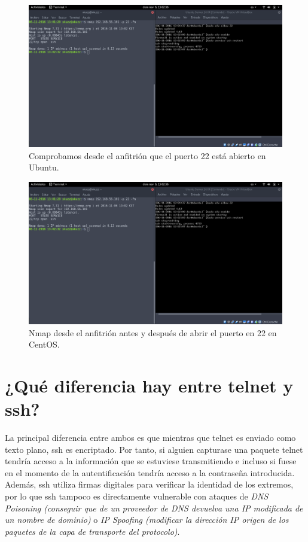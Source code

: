 \begin{flushleft}
\begin{figure}[H]
	\centering
	\includegraphics[scale=0.3]{nmap_ubu.png}
	\caption{Comprobamos desde el anfitrión que el puerto 22 está abierto en Ubuntu.}
\end{figure}

\begin{figure}[H]
	\centering
	\includegraphics[scale=0.3]{nmap_ubu.png}
	\caption{Nmap desde el anfitrión antes y después de abrir el puerto en 22 en CentOS.}
\end{figure}
\section{¿Qué diferencia hay entre telnet y ssh?}
La principal diferencia entre ambos es que mientras que telnet es enviado como texto plano, ssh es encriptado. Por tanto, si alguien capturase una paquete telnet tendría acceso a la información que se estuviese transmitiendo e incluso si fuese en el momento de la autentificación tendría acceso a la contraseña introducida. Además, ssh utiliza firmas digitales para verificar la identidad de los extremos, por lo que ssh tampoco es directamente vulnerable con ataques de \textit{DNS Poisoning (conseguir que de un proveedor de DNS devuelva una IP modificada de un nombre de dominio)} o \textit{IP Spoofing (modificar la dirección IP origen de los paquetes de la capa de transporte del protocolo)}. \cite{c4}


\end{flushleft}
